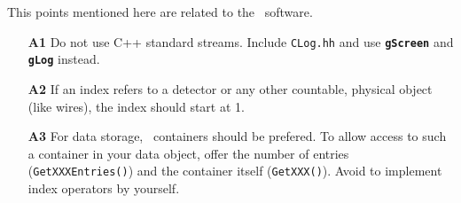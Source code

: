 This points mentioned here are related to the \rs\ software.

\begin{itemize}
\item[\bf A1] Do not use C++ standard streams. Include {\tt CLog.hh} and use
  {\tt\bf gScreen} and {\bf\tt gLog} instead.
\item[\bf A2] If an index refers to a detector or any other countable, physical
  object (like wires), the index should start at 1.
\item[\bf A3] For data storage, \root\ containers should be prefered. To allow
 access to such a container in your data object, offer the number
 of entries ({\tt GetXXXEntries()}) and the container itself
({\tt GetXXX()}). Avoid to implement index operators by yourself.
\end{itemize}
